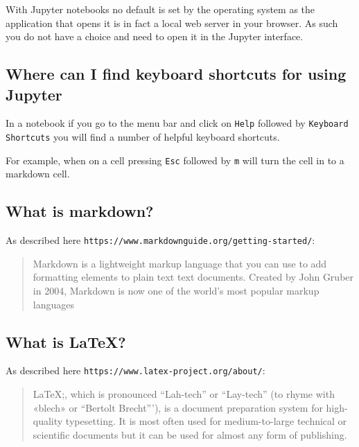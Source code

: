 With Jupyter notebooks no default is set by the operating system as the
application that opens it is in fact a local web server in your browser. As such
you do not have a choice and need to open it in the Jupyter interface.


\subsection{Where can I find keyboard shortcuts for using Jupyter}

In a notebook if you go to the menu bar and click on \texttt{Help} followed by
\texttt{Keyboard Shortcuts} you will find a number of helpful keyboard shortcuts.


For example, when on a cell pressing \texttt{Esc} followed by \texttt{m} will turn the cell in
to a markdown cell.


\subsection{What is markdown?}

As described here \texttt{https://www.markdownguide.org/getting-started/}:

\begin{quote}
Markdown is a lightweight markup language that you can use to add formatting
elements to plain text text documents. Created by John Gruber in 2004,
Markdown is now one of the world’s most popular markup languages
\end{quote}


\subsection{What is LaTeX?}

As described here \texttt{https://www.latex-project.org/about/}:

\begin{quote}
LaTeX;, which is pronounced ``Lah-tech'' or ``Lay-tech'' (to rhyme with «blech» or
``Bertolt Brecht'''), is a document preparation system for high-quality
typesetting. It is most often used for medium-to-large technical or scientific
documents but it can be used for almost any form of publishing.
\end{quote}

